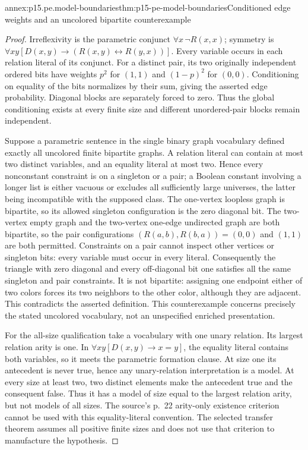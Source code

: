\begin{annexitem}{annex:p15.pe.model-boundaries}{thm:p15-pe-model-boundaries}{Conditioned edge weights and an uncolored bipartite counterexample}
\begin{proof}
Irreflexivity is the parametric conjunct
\(\forall x\,\neg R(x,x)\); symmetry is
\(\forall x y[D(x,y)\to(R(x,y)\leftrightarrow R(y,x))]\).
Every variable occurs in each relation literal of its conjunct.
For a distinct pair, its two originally independent ordered bits have
weights \(p^2\) for \((1,1)\) and \((1-p)^2\) for \((0,0)\).
Conditioning on equality of the bits normalizes by their sum, giving
the asserted edge probability. Diagonal blocks are separately forced
to zero. Thus the global conditioning exists at every finite size
and different unordered-pair blocks remain independent.

Suppose a parametric sentence in the single binary graph vocabulary
defined exactly all uncolored finite bipartite graphs. A relation
literal can contain at most two distinct variables, and an equality
literal at most two. Hence every nonconstant constraint is on a
singleton or a pair; a Boolean constant involving a longer list is
either vacuous or excludes all sufficiently large universes, the latter
being incompatible with the supposed class.
The one-vertex loopless graph is bipartite, so its allowed singleton
configuration is the zero diagonal bit. The two-vertex empty graph
and the two-vertex one-edge undirected graph are both bipartite, so
the pair configurations \((R(a,b),R(b,a))=(0,0)\) and \((1,1)\)
are both permitted. Constraints on a pair cannot inspect other
vertices or singleton bits: every variable must occur in every
literal. Consequently the triangle with zero diagonal and every
off-diagonal bit one satisfies all the same singleton and pair
constraints. It is not bipartite: assigning one endpoint either of
two colors forces its two neighbors to the other color, although
they are adjacent. This contradicts the asserted definition.
This counterexample concerns precisely the stated uncolored
vocabulary, not an unspecified enriched presentation.

For the all-size qualification take a vocabulary with one unary
relation. Its largest relation arity is one. In
\(\forall x y[D(x,y)\to x=y]\), the equality literal contains both
variables, so it meets the parametric formation clause.
At size one its antecedent is never true, hence any unary-relation
interpretation is a model. At every size at least two, two distinct
elements make the antecedent true and the consequent false.
Thus it has a model of size equal to the largest relation arity,
but not models of all sizes. The source's p.~22 arity-only existence
criterion cannot be used with this equality-literal convention.
The selected transfer theorem assumes all positive finite sizes and
does not use that criterion to manufacture the hypothesis.


\end{proof}
\end{annexitem}

